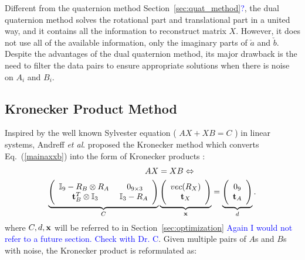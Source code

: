 \documentclass[twocolumn,10pt]{asme2ej}
\newcommand{\ttt}{{\bf t}}
\begin{document}
Different from the quaternion method Section~\textcolor{blue}{\ref{sec:quat_method}?}, the dual quaternion method solves the rotational part and translational part in a united way, and it contains all the information to reconstruct matrix $X$. However, it does not use all of the available information, only the imaginary parts of $\check{a}$ and $\check{b}$. Despite the advantages of the dual quaternion method, its major drawback is the need to filter the data pairs to ensure appropriate solutions when there is noise on $A_{i}$ and $B_{i}$.

\subsection{Kronecker Product Method }
\label{sec:Kronecker}
Inspired by the well known Sylvester equation ( $AX + XB = C$ ) in linear systems, Andreff {\it et al}. \cite{andreff1999line} proposed the Kronecker method which converts  Eq.~(\ref{mainaxxb}) into the form of Kronecker products \cite{andreff1999line}: %
\begin{equation}
\begin{split}
AX &= XB  \Leftrightarrow\\
\underbrace{\Bigg(
\begin{array}{cc}
\mathbb{I}_{9} - R_{B} \otimes R_{A} \; & \; 0_{9 \times 3}\\
\ttt_{B}^{T} \otimes \mathbb{I}_{3} & \mathbb{I}_{3} - R_{A}
\end{array}
\Bigg)}_{C}
&\underbrace{\Bigg(
\begin{array}{c}
vec(R_{X})\\
\ttt_{X}
\end{array}
\Bigg)}_{\bf x} =
\underbrace{
\Bigg(
\begin{array}{c}
0_{9}\\
\ttt_{A}
\end{array}
\Bigg)}_{d}.
\end{split}
\label{KroneckerMethod}
\end{equation}
where $C, d, \bf x$ will be referred to in Section~\ref{sec:optimization} \textcolor{blue}{Again I would not refer to a future section. Check with Dr. C}. 
Given multiple pairs of $A$s and $B$s with noise, the Kronecker product is reformulated as:%
\end{document}
